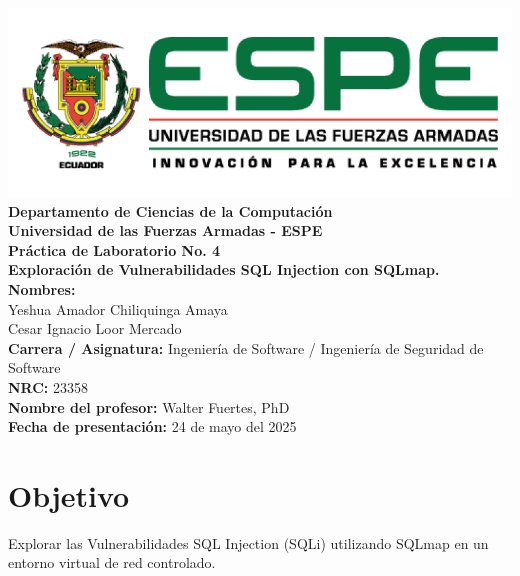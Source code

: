 \documentclass[12pt,a4paper]{article}
\begin{document}
\begin{titlepage}
    \centering
    \vspace*{1cm}
    \includegraphics[width=0.8\linewidth]{espe.png}\\[0.5cm]
    
    \Large \textbf{Departamento de Ciencias de la Computación}\\
    \large \textbf{Universidad de las Fuerzas Armadas - ESPE}\\[0.5cm]
    
    \Huge \textbf{Práctica de Laboratorio No. 4}\\[0.3cm]
    \Large \textbf{Exploración de Vulnerabilidades SQL Injection con SQLmap.}\\[0.8cm]
    
    \textbf{Nombres:}\\
    Yeshua Amador Chiliquinga Amaya\\
    Cesar Ignacio Loor Mercado\\[0.3cm]
    
    \textbf{Carrera / Asignatura:} Ingeniería de Software / Ingeniería de Seguridad de Software\\
    \textbf{NRC:} 23358\\
    \textbf{Nombre del profesor:} Walter Fuertes, PhD\\[0.5cm]
    
    \textbf{Fecha de presentación:} 24 de mayo del 2025\\[1cm]    
    \vfill
\end{titlepage}

\tableofcontents
\newpage

\section{Objetivo}
Explorar las Vulnerabilidades SQL Injection (SQLi) utilizando SQLmap en un entorno virtual de red controlado.
\end{document}
